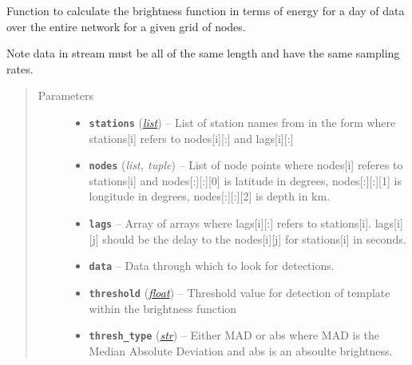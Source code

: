 \documentclass[a4paper,10pt,english]{sphinxmanual}
\begin{document}

\begin{fulllineitems}
\label{core:bright_lights.brightness}
Function to calculate the brightness function in terms of energy for a day
of data over the entire network for a given grid of nodes.

Note data in stream must be all of the same length and have the same
sampling rates.
\begin{quote}\begin{description}
\item[{Parameters}] \leavevmode\begin{itemize}
\item {} 
\textbf{\texttt{stations}} (\href{https://docs.python.org/library/functions.html\#list}{\emph{list}}) -- List of station names from in the form where stations{[}i{]}    refers to nodes{[}i{]}{[}:{]} and lags{[}i{]}{[}:{]}

\item {} 
\textbf{\texttt{nodes}} (\emph{list, tuple}) -- List of node points where nodes{[}i{]} referes to stations{[}i{]} and    nodes{[}:{]}{[}:{]}{[}0{]} is latitude in degrees, nodes{[}:{]}{[}:{]}{[}1{]} is longitude in    degrees, nodes{[}:{]}{[}:{]}{[}2{]} is depth in km.

\item {} 
\textbf{\texttt{lags}} -- Array of arrays where lags{[}i{]}{[}:{]} refers to stations{[}i{]}.    lags{[}i{]}{[}j{]} should be the delay to the nodes{[}i{]}{[}j{]} for stations{[}i{]} in seconds.

\item {} 
\textbf{\texttt{data}} -- Data through which to look for detections.

\item {} 
\textbf{\texttt{threshold}} (\href{https://docs.python.org/library/functions.html\#float}{\emph{float}}) -- Threshold value for detection of template within the    brightness function

\item {} 
\textbf{\texttt{thresh\_type}} (\href{https://docs.python.org/library/functions.html\#str}{\emph{str}}) -- Either MAD or abs where MAD is the Median Absolute    Deviation and abs is an absoulte brightness.


\end{itemize}
\end{description}
\end{quote}
\end{fulllineitems}
\end{document}
